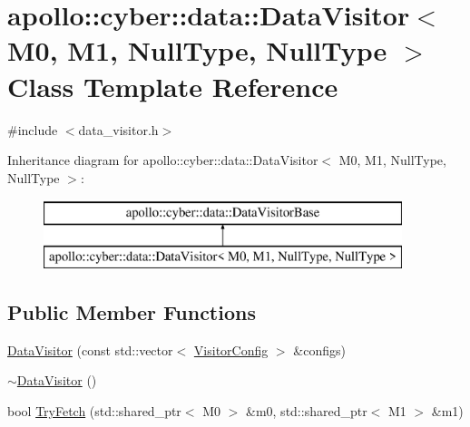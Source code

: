 \hypertarget{classapollo_1_1cyber_1_1data_1_1DataVisitor_3_01M0_00_01M1_00_01NullType_00_01NullType_01_4}{\section{apollo\-:\-:cyber\-:\-:data\-:\-:Data\-Visitor$<$ M0, M1, Null\-Type, Null\-Type $>$ Class Template Reference}
\label{classapollo_1_1cyber_1_1data_1_1DataVisitor_3_01M0_00_01M1_00_01NullType_00_01NullType_01_4}
}


{\ttfamily \#include $<$data\-\_\-visitor.\-h$>$}

Inheritance diagram for apollo\-:\-:cyber\-:\-:data\-:\-:Data\-Visitor$<$ M0, M1, Null\-Type, Null\-Type $>$\-:\begin{figure}[H]
\begin{center}
\leavevmode
\includegraphics[height=2.000000cm]{classapollo_1_1cyber_1_1data_1_1DataVisitor_3_01M0_00_01M1_00_01NullType_00_01NullType_01_4}
\end{center}
\end{figure}
\subsection*{Public Member Functions}
\begin{DoxyCompactItemize}
\item 
\hyperlink{classapollo_1_1cyber_1_1data_1_1DataVisitor_3_01M0_00_01M1_00_01NullType_00_01NullType_01_4_a80c2d63eb733d49914472df81f44419b}{Data\-Visitor} (const std\-::vector$<$ \hyperlink{structapollo_1_1cyber_1_1data_1_1VisitorConfig}{Visitor\-Config} $>$ \&configs)
\item 
\hyperlink{classapollo_1_1cyber_1_1data_1_1DataVisitor_3_01M0_00_01M1_00_01NullType_00_01NullType_01_4_a94267ad93bcda46bb0b561bcdd38317e}{$\sim$\-Data\-Visitor} ()
\item 
bool \hyperlink{classapollo_1_1cyber_1_1data_1_1DataVisitor_3_01M0_00_01M1_00_01NullType_00_01NullType_01_4_a4fab945c809cb23efd401607d040321b}{Try\-Fetch} (std\-::shared\-\_\-ptr$<$ M0 $>$ \&m0, std\-::shared\-\_\-ptr$<$ M1 $>$ \&m1)
\end{DoxyCompactItemize}
